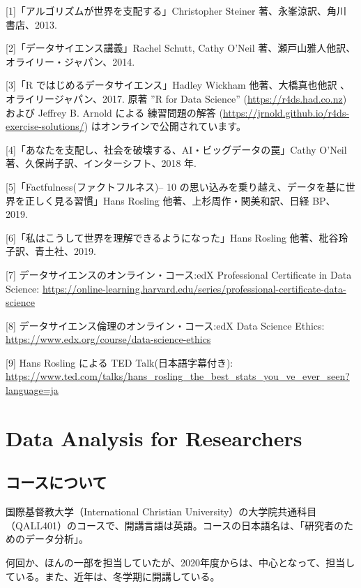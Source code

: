 \documentclass[
]{book}
\theoremstyle{definition}
\theoremstyle{definition}
\theoremstyle{definition}
\theoremstyle{definition}
\theoremstyle{remark}
\begin{document}
{[}1{]}「アルゴリズムが世界を支配する」Christopher Steiner 著、永峯涼訳、角川 書店、2013.

{[}2{]}「データサイエンス講義」Rachel Schutt, Cathy O'Neil 著、瀬戸山雅人他訳、オライリー・ジャパン、2014.

{[}3{]}「R ではじめるデータサイエンス」Hadley Wickham 他著、大橋真也他訳 、オライリージャパン、2017. 原著 ''R for Data Science'' (\url{https://r4ds.had.co.nz}) および Jeffrey B. Arnold による 練習問題の解答
(\url{https://jrnold.github.io/r4ds-exercise-solutions/}) はオンラインで公開されています。

{[}4{]}「あなたを支配し、社会を破壊する、AI・ビッグデータの罠」Cathy O'Neil 著、久保尚子訳、インターシフト、2018 年.

{[}5{]}「Factfulness(ファクトフルネス)-- 10 の思い込みを乗り越え、データを基に世界を正しく見る習慣」Hans
Rosling 他著、上杉周作・関美和訳、日経 BP、2019.

{[}6{]}「私はこうして世界を理解できるようになった」Hans Rosling 他著、枇谷玲子訳、青土社、2019.

{[}7{]} データサイエンスのオンライン・コース:edX Professional Certificate in Data Science:
\url{https://online-learning.harvard.edu/series/professional-certificate-data-science}

{[}8{]} データサイエンス倫理のオンライン・コース:edX Data Science Ethics: \url{https://www.edx.org/course/data-science-ethics}

{[}9{]} Hans Rosling による TED Talk(日本語字幕付き): \url{https://www.ted.com/talks/hans_rosling_the_best_stats_you_ve_ever_seen?language=ja}

\hypertarget{da4r}{%
\chapter{Data Analysis for Researchers}\label{da4r}}

\hypertarget{ux30b3ux30fcux30b9ux306bux3064ux3044ux3066}{%
\section{コースについて}\label{ux30b3ux30fcux30b9ux306bux3064ux3044ux3066}}

国際基督教大学（International Christian University）の大学院共通科目（QALL401）のコースで、開講言語は英語。コースの日本語名は、「研究者のためのデータ分析」。

何回か、ほんの一部を担当していたが、2020年度からは、中心となって、担当している。また、近年は、冬学期に開講している。
\end{document}
